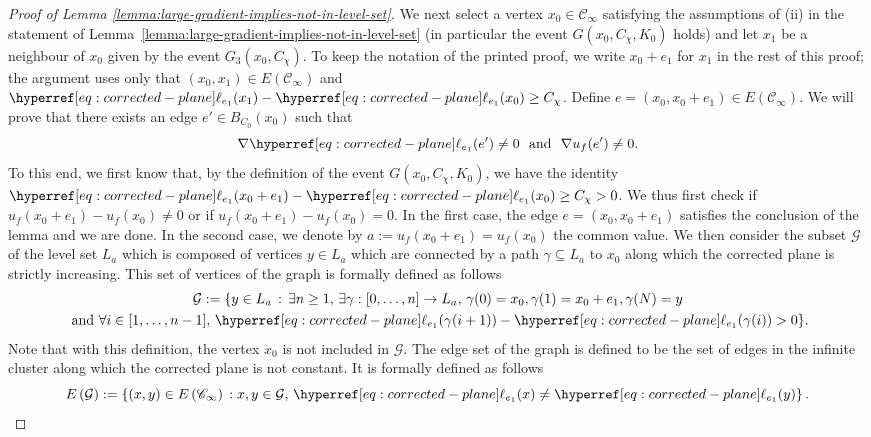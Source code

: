 \documentclass[12pt]{amsart}
\numberwithin{equation}{section}
\begin{document}
\begin{proof}[Proof of Lemma \ref{lemma:large-gradient-implies-not-in-level-set}]
		We next select a vertex $x_0 \in \mathscr{C}_\infty$ satisfying the assumptions of (ii) in the statement of Lemma~\ref{lemma:large-gradient-implies-not-in-level-set} (in particular the event $G(x_0, C_\chi,K_0)$ holds) and let $x_1$ be a neighbour of $x_0$ given by the event $G_3(x_0 , C_\chi)$. To keep the notation of the printed proof, we write $x_0 + e_1$ for $x_1$ in the rest of this proof; the argument uses only that $(x_0 , x_1) \in E(\mathscr{C}_\infty)$ and $\ellp{e_1}(x_1) - \ellp{e_1}(x_0) \geq C_\chi$. Define $e = (x_0 , x_0 + e_1) \in E\left( \mathscr{C}_\infty \right).$ We will prove that there exists an edge $e' \in B_{C_0}(x_0)$ such that 
		\begin{equation} \label{eq:sensitivityprop}
			\nabla \ellp{e_1} (e') \neq 0 ~~\mbox{and}~~ \nabla u_f(e') \neq 0.
		\end{equation}
		To this end, we first know that, by the definition of the event $G(x_0, C_\chi,K_0)$, we have the identity $\ellp{e_1}(x_0 + e_1) - \ellp{e_1}(x_0) \geq C_\chi > 0$. We thus first check if $u_f(x_0+e_1) - u_f(x_0) \neq 0$ or if $u_f(x_0+e_1) - u_f(x_0) = 0$. In the first case, the edge $e = (x_0 ,x_0 +  e_1)$ satisfies the conclusion of the lemma and we are done. In the second case, we denote by $a := u_f(x_0+e_1) = u_f(x_0)$ the common value. We then consider the subset $\mathcal{G}$ of the level set $L_a$ which is composed of vertices $y \in L_a$ which are connected by a path $\gamma \subseteq L_a$ to $x_0$ along which the corrected plane is strictly increasing. This set of vertices of the graph is formally defined as follows
		\begin{multline*}
			\mathcal{G} := \{ y \in L_a \, : \, \exists n \geq 1, \, \exists \gamma: [ 0 , \ldots, n ] \to L_a, \, \gamma(0) = x_0, \gamma(1) = x_0+e_1, \gamma(N) = y \\ ~\mbox{and}~ \forall i \in [ 1 , \ldots, n-1], \, \ellp{e_1} (\gamma(i+1)) - \ellp{e_1} (\gamma(i)) > 0 \}.
		\end{multline*}
		Note that with this definition, the vertex $x_0$ is not included in $\mathcal{G}.$ The edge set of the graph is defined to be the set of edges in the infinite cluster along which the corrected plane is not constant. It is formally defined as follows
		\begin{equation*}
			E \left( \mathcal{G} \right) := \left\{ (x , y) \in E \left( \mathscr{C}_\infty \right) \, : x, y\in \mathcal{G}, \, \ellp{e_1}(x) \neq \ellp{e_1}(y) \right\}.
		\end{equation*}

\end{proof}
\end{document}
